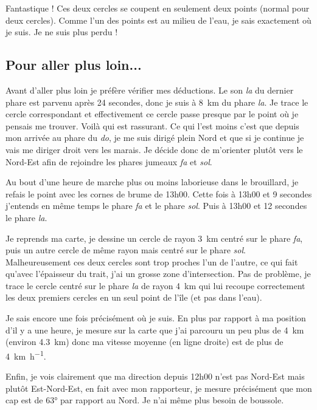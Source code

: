 \documentclass[class=report,crop=false]{standalone}
\begin{document}
Fantastique ! Ces deux cercles se coupent en seulement deux points (normal pour deux cercles).
Comme l'un des points est au milieu de l'eau, je sais exactement où je suis.
Je ne suis plus perdu !




\subsection{Pour aller plus loin...}

Avant d'aller plus loin je préfère vérifier mes déductions.
Le son \emph{la} du dernier phare est parvenu après 24 secondes, donc je suis
à \SI{8}{\kilo \meter} du phare \emph{la}. Je trace le cercle correspondant
et effectivement ce cercle passe presque par le point où je pensais me trouver.
Voilà qui est rassurant.
Ce qui l'est moins c'est que depuis mon arrivée au phare du \emph{do}, je me suis dirigé 
plein Nord et que si je continue je vais me diriger droit vers les marais.
Je décide donc de m'orienter plutôt vers le Nord-Est afin de rejoindre les phares 
jumeaux \emph{fa} et \emph{sol}.

Au bout d'une heure de marche plus ou moins laborieuse dans le brouillard, je refais le point
avec les cornes de brume de 13h00.
Cette fois à 13h00 et 9 secondes j'entends en même temps le phare \emph{fa} et le phare \emph{sol}.
Puis à 13h00 et 12 secondes le phare \emph{la}.



Je reprends ma carte, je dessine un cercle de rayon \SI{3}{\kilo \meter}
centré sur le phare \emph{fa}, puis un autre cercle de même rayon mais centré sur le phare 
\emph{sol}. Malheureusement ces deux cercles sont trop proches l'un de l'autre, ce qui fait
qu'avec l'épaisseur du trait, j'ai un grosse zone d'intersection.
Pas de problème, je trace le cercle centré sur le phare \emph{la} de rayon \SI{4}{\kilo \meter}
qui lui recoupe correctement les deux premiers cercles
en un seul point de l'île (et pas dans l'eau).

Je sais encore une fois précisément où je suis. En plus 
par rapport à ma position d'il y a une heure, je mesure sur la carte
que j'ai parcouru un peu plus de \SI{4}{\kilo \meter}
(environ \SI{4.3}{\kilo \meter}) donc ma vitesse moyenne (en ligne droite)
est de plus de \SI{4}{\kilo \meter \per \hour}.

Enfin, je vois clairement que ma direction depuis 12h00
n'est pas Nord-Est mais plutôt Est-Nord-Est, en fait avec mon rapporteur, je mesure précisément que mon cap est de
\ang{63} par rapport au Nord. Je n'ai même plus besoin de boussole.
\end{document}
